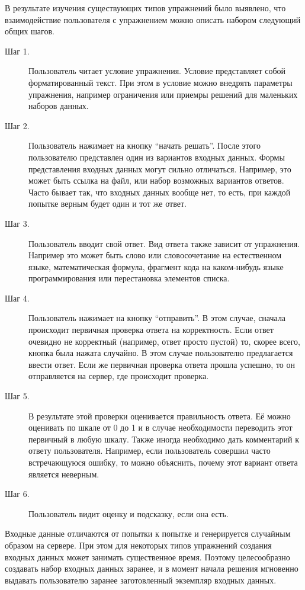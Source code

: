 \documentclass{matmex-diploma-custom}
\begin{document}
В результате изучения существующих типов упражнений было выявлено, что
взаимодействие пользователя с упражнением можно
описать набором следующий общих шагов.
\begin{description}
\item[Шаг 1.] Пользователь читает условие упражнения. Условие
  представляет собой форматированный текст. При этом в условие можно
  внедрять параметры упражнения, например ограничения или приемры
  решений для маленьких наборов данных.

\item[Шаг 2.] Пользователь нажимает на кнопку ``начать решать''.
  После этого пользователю представлен один из вариантов входных
  данных. Формы представления входных данных могут сильно
  отличаться. Например, это может быть ссылка на файл, или
  набор возможных вариантов ответов. Часто бывает так, что входных
  данных вообще нет, то есть, при каждой попытке верным будет один и тот
  же ответ.
\item[Шаг 3.] Пользователь вводит свой ответ. Вид ответа также
  зависит от упражнения. Например это может быть слово или
  словосочетание на естественном языке, математическая формула, фрагмент
  кода на каком-нибудь языке программирования или перестановка элементов
  списка.
\item[Шаг 4.] Пользователь нажимает на кнопку ``отправить''. В этом
  случае, сначала происходит первичная проверка ответа на
  корректность. Если ответ очевидно не корректный (например, ответ
  просто пустой) то, скорее всего, кнопка была нажата случайно. В этом
  случае пользователю предлагается ввести ответ. Если же первичная
  проверка ответа прошла успешно, то он отправляется на сервер, где
  происходит проверка.
\item[Шаг 5.] В результате этой проверки оценивается правильность
  ответа. Её можно оценивать по шкале от 0 до 1 и в случае необходимости
  переводить этот первичный в любую шкалу. Также иногда необходимо дать
  комментарий к ответу пользователя. Например, если пользователь
  совершил часто встречающуюся ошибку, то можно объяснить, почему этот
  вариант ответа является неверным.
\item[Шаг 6.] Пользователь видит оценку и подсказку, если она есть.
\end{description}

Входные данные отличаются от попытки к попытке и генерируется
случайным образом на сервере. При этом для некоторых типов упражнений
создания входных данных может занимать существенное время. Поэтому
целесообразно создавать набор входных данных заранее, и в момент
начала решения мгновенно выдавать пользователю заранее заготовленный
экземпляр входных данных.
\end{document}
